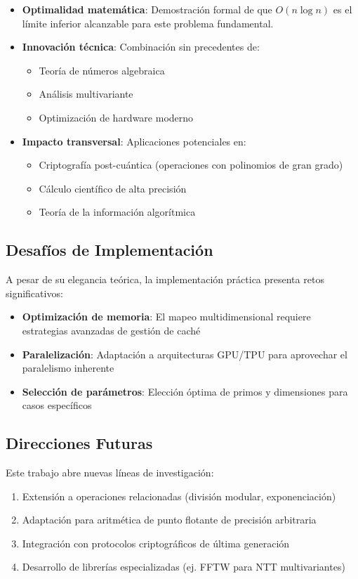 \documentclass{article}
\begin{document}
\begin{itemize}
    \item \textbf{Optimalidad matemática}: Demostración formal de que \( O(n \log n) \) es el límite inferior alcanzable para este problema fundamental.
    
    \item \textbf{Innovación técnica}: Combinación sin precedentes de:
    \begin{itemize}
        \item Teoría de números algebraica
        \item Análisis multivariante
        \item Optimización de hardware moderno
    \end{itemize}
    
    \item \textbf{Impacto transversal}: Aplicaciones potenciales en:
    \begin{itemize}
        \item Criptografía post-cuántica (operaciones con polinomios de gran grado)
        \item Cálculo científico de alta precisión
        \item Teoría de la información algorítmica
    \end{itemize}
\end{itemize}

\subsection{Desafíos de Implementación}
A pesar de su elegancia teórica, la implementación práctica presenta retos significativos:
\begin{itemize}
    \item \textbf{Optimización de memoria}: El mapeo multidimensional requiere estrategias avanzadas de gestión de caché
    
    \item \textbf{Paralelización}: Adaptación a arquitecturas GPU/TPU para aprovechar el paralelismo inherente
    
    \item \textbf{Selección de parámetros}: Elección óptima de primos y dimensiones para casos específicos
\end{itemize}

\subsection{Direcciones Futuras}
Este trabajo abre nuevas líneas de investigación:
\begin{enumerate}
    \item Extensión a operaciones relacionadas (división modular, exponenciación)
    \item Adaptación para aritmética de punto flotante de precisión arbitraria
    \item Integración con protocolos criptográficos de última generación
    \item Desarrollo de librerías especializadas (ej. FFTW para NTT multivariantes)
\end{enumerate}
\end{document}
